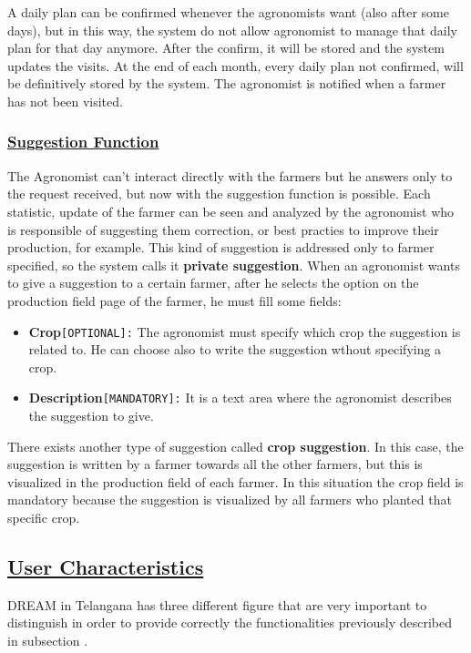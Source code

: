 	A daily plan can be confirmed whenever the agronomists want (also after some days), but in this way, the system do not allow agronomist to manage that daily plan for that day anymore. After the confirm, it will be stored and the system updates the visits. At the end of each month, every daily plan not confirmed, will be definitively stored by the system. The agronomist is notified when a farmer has not been visited.
	
	\subsubsection[Suggestion Function]{\hyperlink{toc}{Suggestion Function}}
		\label{sec:suggestionFunction} 
	The Agronomist can't interact directly with the farmers but he answers only to the request received, but now with the suggestion function is possible. Each statistic, update of the farmer can be seen and analyzed by the agronomist who is responsible of suggesting them correction, or best practies to improve their production, for example. This kind of suggestion is addressed only to farmer specified, so the system calls it \textbf{private suggestion}. When an agronomist wants to give a suggestion to a certain farmer, after he selects the option on the production field page of the farmer, he must fill some fields:
	
		\begin{itemize}
			\item \textbf{Crop}\texttt{[OPTIONAL]:} The agronomist must specify which crop the suggestion is related to. He can choose also to write the suggestion wthout specifying a crop.
			
			 \item \textbf{Description}\texttt{[MANDATORY]:} It is a text area where the agronomist describes the suggestion to give.
		\end{itemize}
	
	There exists another type of suggestion called \textbf{crop suggestion}. In this case, the suggestion is written by a farmer towards all the other farmers, but this is visualized in the production field of each farmer. In this situation the crop field is mandatory because the suggestion is visualized by all farmers who planted that specific crop.  
		
		
\subsection[User Characteristics]{\hyperlink{toc}{User Characteristics}}
	\label{sec:userCharacteristics}
	DREAM in Telangana has three different figure that are very important to distinguish in order to provide correctly the functionalities previously described in subsection .
	
